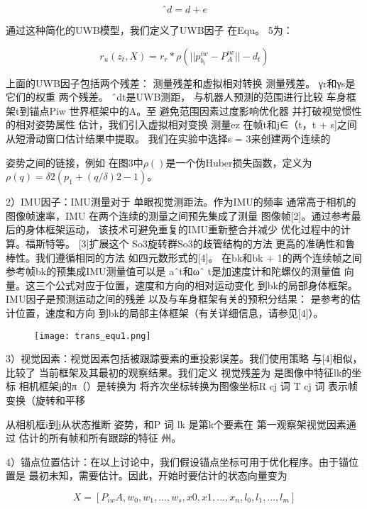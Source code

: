 \begin{translation}
\begin{equation}
ˆd = d + e
\end{equation}

通过这种简化的UWB模型，我们定义了UWB因子 在Equ。 5为：


\begin{equation}
    r_u(z_t, X) = r_r * \rho(||p_{b_t}^{iw} - P_{A}^{iw}|| - d_t)
\end{equation}

上面的UWB因子包括两个残差： 测量残差和虚拟相对转换 测量残差。 γr和γs是它们的权重
两个残差。 ˆdt是UWB测距， 与机器人预测的范围进行比较 车身框架t到锚点Piw 世界框架中的A。至
避免范围因素过度影响优化器 并打破视觉惯性的相对姿势属性 估计，我们引入虚拟相对变换 测量ez
在帧t和j∈（t，t + s]之间 从短滑动窗口估计结果中提取。 我们在实验中选择s = 3来创建两个连续的

姿势之间的链接，例如
在图3中$\rho()$是一个伪Huber损失函数，定义为$ \rho (q)= \delta 2( p_1 +( q /\delta) 2-1)$。

2）IMU因子：IMU测量对于 单眼视觉测距法。作为IMU的频率 通常高于相机的图像帧速率，IMU
在两个连续的测量之间预先集成了测量 图像帧[2]。通过参考最后的身体框架运动， 该技术可避免重复的IMU重新整合并减少
优化过程中的计算。福斯特等。 [3]扩展这个 So3旋转群So3的歧管结构的方法 更高的准确性和鲁棒性。我们遵循相同的方法
如四元数形式的[4]。 在bk和bk + 1的两个连续帧之间参考帧bk的预集成IMU测量值可以是
aˆt和ωˆ t是加速度计和陀螺仪的测量值 向量。这三个公式对应于位置，速度和方向的相对运动变化
到bk的局部身体框架。 IMU因子是预测运动之间的残差 以及与车身框架有关的预积分结果：
是参考的估计位置，速度和方向
到bk的局部主体框架（有关详细信息，请参见[4]）。

\begin{figure}[H]
  \centering
  \texttt{[image: trans\_equ1.png]}
  \caption{}
  \label{fig:gmapping}
\end{figure}

3）视觉因素：视觉因素包括被跟踪要素的重投影误差。我们使用策略 与[4]相似，比较了
当前框架及其最初的观察结果。我们定义 视觉残差为 是图像中特征lk的坐标
相机框架j的π（）是转换为 将齐次坐标转换为图像坐标R cj
词 T cj 词 表示帧变换（旋转和平移

从相机框i到j从状态推断 姿势，和P 词 lk 是第k个要素在 第一观察架视觉因素通过 估计的所有帧和所有跟踪的特征
州。

4）锚点位置估计：在以上讨论中，我们假设锚点坐标可用于优化程序。由于锚位置是
最初未知，需要估计。因此，开始时要估计的状态向量变为

\begin{equation}
X = [P_{iw} A, w_0, w_1, ..., w_s, x0, x1, ... , x_n, l_0, l_1, ... , l_m]
\end{equation}


\end{translation}

